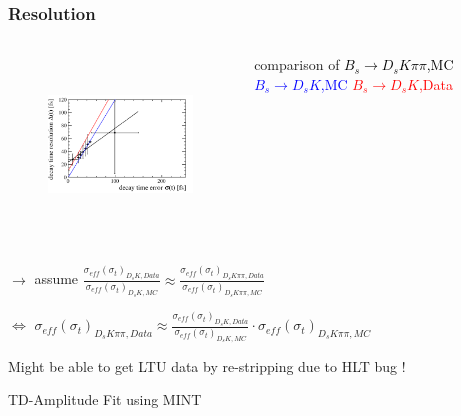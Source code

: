 \documentclass[]{beamer}
\begin{document}
\begin{frame}
\frametitle{Resolution}

\vspace{-1cm}

\begin{columns}


\begin{figure}
\includegraphics[width=6.0cm,height=4.7cm]{plots/ProperTimeReso_MC.pdf}
\end{figure}




comparison of \newline  
\textcolor{black}{$B_{s}\to D_{s}K\pi\pi$,MC} \newline
 \textcolor{blue}{$B_{s}\to D_{s}K$,MC} \newline
 \textcolor{red}{$B_{s}\to D_{s}K$,Data}



\end{columns}

$\rightarrow$ assume $\frac{\sigma_{eff}(\sigma_{t})_{D_{s}K,Data}}{\sigma_{eff}(\sigma_{t})_{D_{s}K,MC}} \approx \frac{\sigma_{eff}(\sigma_{t})_{D_{s}K\pi\pi,Data}}{\sigma_{eff}(\sigma_{t})_{D_{s}K\pi\pi,MC}}$ \newline

$\Leftrightarrow$ $\sigma_{eff}(\sigma_{t})_{D_{s}K\pi\pi,Data} \approx \frac{\sigma_{eff}(\sigma_{t})_{D_{s}K,Data}}{\sigma_{eff}(\sigma_{t})_{D_{s}K,MC}} \cdot \sigma_{eff}(\sigma_{t})_{D_{s}K\pi\pi,MC}$

\bigskip

\bfseries

Might be able to get LTU data by re-stripping due to HLT bug !

\normalfont

\end{frame}


\begin{frame}

\Huge \bfseries


\begin{center}

TD-Amplitude Fit using MINT

\end{center}

\normalsize
\normalfont

\end{frame}
\end{document}

